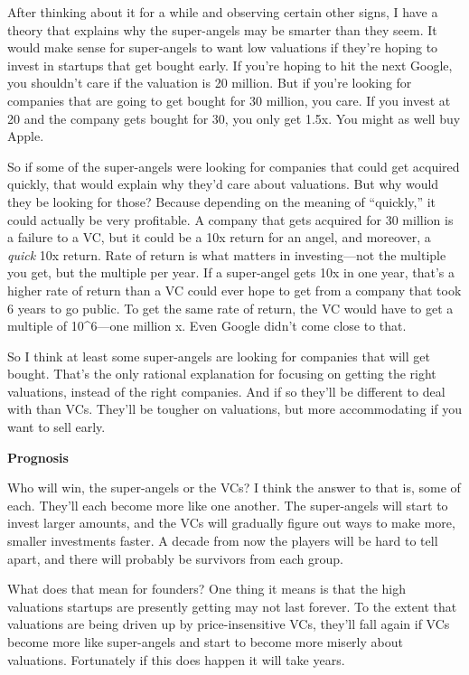 After thinking about it for a while and observing certain other signs, I
have a theory that explains why the super-angels may be smarter than
they seem. It would make sense for super-angels to want low valuations
if they're hoping to invest in startups that get bought early. If you're
hoping to hit the next Google, you shouldn't care if the valuation is 20
million. But if you're looking for companies that are going to get
bought for 30 million, you care. If you invest at 20 and the company
gets bought for 30, you only get 1.5x. You might as well buy Apple.

So if some of the super-angels were looking for companies that could get
acquired quickly, that would explain why they'd care about valuations.
But why would they be looking for those? Because depending on the
meaning of ``quickly,'' it could actually be very profitable. A company
that gets acquired for 30 million is a failure to a VC, but it could be
a 10x return for an angel, and moreover, a \emph{quick} 10x return. Rate
of return is what matters in investing---not the multiple you get, but
the multiple per year. If a super-angel gets 10x in one year, that's a
higher rate of return than a VC could ever hope to get from a company
that took 6 years to go public. To get the same rate of return, the VC
would have to get a multiple of 10\^{}6---one million x. Even Google
didn't come close to that.

So I think at least some super-angels are looking for companies that
will get bought. That's the only rational explanation for focusing on
getting the right valuations, instead of the right companies. And if so
they'll be different to deal with than VCs. They'll be tougher on
valuations, but more accommodating if you want to sell early.

\textbf{Prognosis}

Who will win, the super-angels or the VCs? I think the answer to that
is, some of each. They'll each become more like one another. The
super-angels will start to invest larger amounts, and the VCs will
gradually figure out ways to make more, smaller investments faster. A
decade from now the players will be hard to tell apart, and there will
probably be survivors from each group.

What does that mean for founders? One thing it means is that the high
valuations startups are presently getting may not last forever. To the
extent that valuations are being driven up by price-insensitive VCs,
they'll fall again if VCs become more like super-angels and start to
become more miserly about valuations. Fortunately if this does happen it
will take years.

